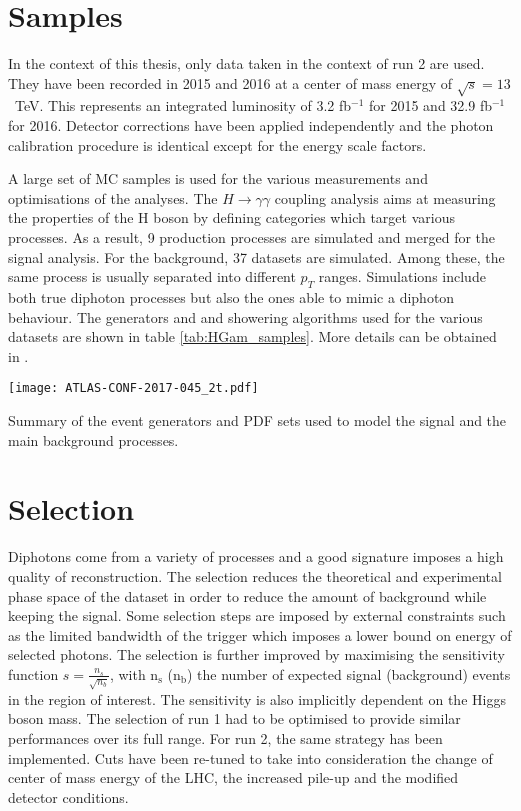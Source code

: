 \section{Samples}
\label{sec:org8347df9}

In the context of this thesis, only data taken in the context of run 2 are used.
They have been recorded in 2015 and 2016 at a center of mass energy of $\sqrt{s}=13$~TeV.
This represents an integrated luminosity of 3.2 fb$^{-1}$ for 2015 and 32.9 fb$^{-1}$ for 2016.
Detector corrections have been applied independently and the photon calibration procedure is identical except for the energy scale factors.

A large set of MC samples is used for the various measurements and optimisations of the analyses.
The $H\rightarrow\gamma\gamma$ coupling analysis \cite{ATLAS-CONF-2017-045} aims at measuring the properties of the H boson by defining categories which target various processes.
As a result, 9 production processes are simulated and merged for the signal analysis.
For the background, 37 datasets are simulated.
Among these, the same process is usually separated into different $p_T$ ranges.
Simulations include both true diphoton processes but also the ones able to mimic a diphoton behaviour.
The generators and and showering algorithms used for the various datasets are shown in table \ref{tab:HGam_samples}.
More details can be obtained in \cite{ATL-COM-PHYS-2016-1784,ATLAS-CONF-2017-045}.

\begin{table}[h!]
  \texttt{[image: ATLAS-CONF-2017-045\_2t.pdf]}
  \caption{Summary of the event generators and PDF sets used to model the signal and the main background processes. \cite{ATLAS-CONF-2017-045}}
  \label{tab:HGam_samples}
\end{table}

\section{Selection}
\label{sec:org173b38f}

Diphotons  come from a variety of processes and a good signature imposes a high quality of reconstruction.
The selection reduces the theoretical and experimental phase space of the dataset in order to reduce the amount of background while keeping the signal.
Some selection steps are imposed by external constraints such as the limited bandwidth of the trigger which imposes a lower bound on energy of selected photons.
The selection is further improved by maximising the sensitivity function \(s=\frac{n_s}{\sqrt{n_b}}\), with n\(_{\text{s}}\) (n\(_{\text{b}}\)) the number of expected signal (background) events in the region of interest.
The sensitivity is also implicitly dependent on the Higgs boson mass.
The selection of run 1 had to be optimised to provide similar performances over its full range.
For run 2, the same strategy has been implemented.
Cuts have been re-tuned to take into consideration the change of center of mass energy of the LHC, the increased pile-up and the modified detector conditions.

